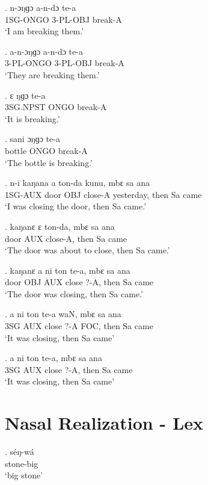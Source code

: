 \documentclass{assets/fieldnotes}
\begin{document}
\exg.
n-ɔŋɡɔ     a-n-dɔ      te-a    \\
1SG-ONGO   3-PL-OBJ   break-A \\%
`I am breaking them.'

\exg.
a-n-ɔŋɡɔ    a-n-dɔ      te-a    \\
3-PL-ONGO   3-PL-OBJ   break-A \\%
`They are breaking them.'

\exg.
ɛ     ŋɡɔ    te-a    \\
3SG.NPST   ONGO   break-A \\%
`It is breaking.'

\exg.
sani     ɔŋɡɔ   te-a    \\
bottle   ONGO   break-A \\%
`The bottle is breaking.'

\exg.
n-i       kaŋana   a     ton-da    kunu,        mbɛ    sa   ana  \\
1SG-AUX   door     OBJ   close-A   yesterday,   then   Sa   came \\%
`I was closing the door, then Sa came.'

\exg.
kaŋanɛ   ɛ     ton-da,    mbɛ    sa   ana  \\
door     AUX   close-A,   then   Sa   came \\%
`The door was about to close, then Sa came.'

\exg.
kaŋanɛ   a     ni    ton     te-a,   mbɛ    sa   ana  \\
door     OBJ   AUX   close   ?-A,    then   Sa   came \\%
`The door was closing, then Sa came.'

\exg.
a     ni    ton     te-a   waN,   mbɛ    sa   ana  \\
3SG   AUX   close   ?-A    FOC,   then   Sa   came \\%
`It was closing, then Sa came'

\exg.
a     ni    ton     te-a,   mbɛ    sa   ana  \\
3SG   AUX   close   ?-A,    then   Sa   came \\%
`It was closing, then Sa came'


\section{Nasal Realization - Lex}


\exg. séŋ-wá\\
stone-big\\
`big stone'
\end{document}

